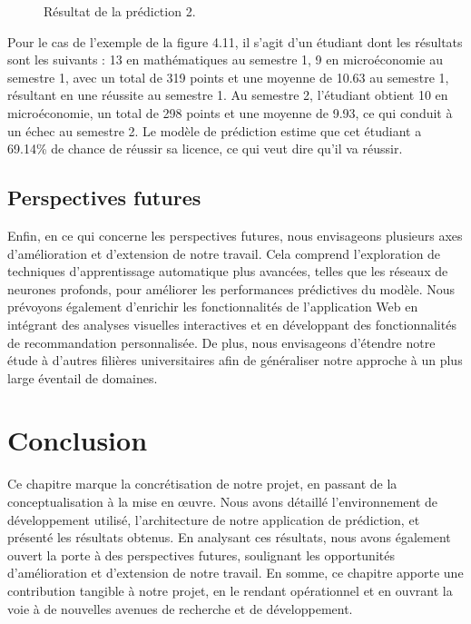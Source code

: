 \begin{figure}[H]%
    \center%
    \setlength{\fboxsep}{5pt}%
    \setlength{\fboxrule}{0.5pt}%
    \caption{Résultat de la prédiction 2.}%
\end{figure}

Pour le cas de l'exemple de la figure 4.11, il s'agit d'un étudiant dont les résultats sont les suivants : 13 en mathématiques au semestre 1, 9 en microéconomie au semestre 1, avec un total de 319 points et une moyenne de 10.63 au semestre 1, résultant en une réussite au semestre 1. Au semestre 2, l'étudiant obtient 10 en microéconomie, un total de 298 points et une moyenne de 9.93, ce qui conduit à un échec au semestre 2. Le modèle de prédiction estime que cet étudiant a 69.14\% de chance de réussir sa licence, ce qui veut dire qu'il va réussir.

\subsection{Perspectives futures}
Enfin, en ce qui concerne les perspectives futures, nous envisageons plusieurs axes d'amélioration et d'extension de notre travail. Cela comprend l'exploration de techniques d'apprentissage automatique plus avancées, telles que les réseaux de neurones profonds, pour améliorer les performances prédictives du modèle. Nous prévoyons également d'enrichir les fonctionnalités de l'application Web en intégrant des analyses visuelles interactives et en développant des fonctionnalités de recommandation personnalisée. De plus, nous envisageons d'étendre notre étude à d'autres filières universitaires afin de généraliser notre approche à un plus large éventail de domaines.

\section{Conclusion}

Ce chapitre marque la concrétisation de notre projet, en passant de la conceptualisation à la mise en œuvre. Nous avons détaillé l'environnement de développement utilisé, l'architecture de notre application de prédiction, et présenté les résultats obtenus. En analysant ces résultats, nous avons également ouvert la porte à des perspectives futures, soulignant les opportunités d'amélioration et d'extension de notre travail. En somme, ce chapitre apporte une contribution tangible à notre projet, en le rendant opérationnel et en ouvrant la voie à de nouvelles avenues de recherche et de développement.
